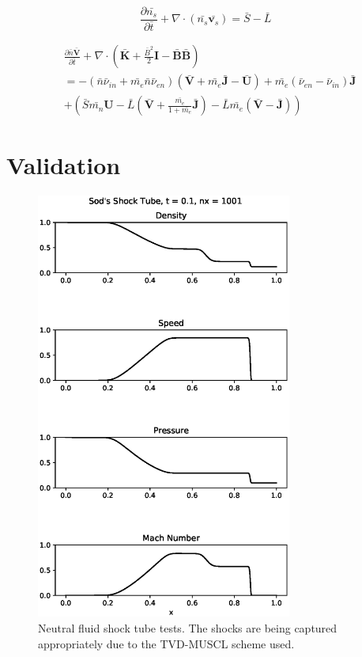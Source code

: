 \documentclass[12pt,upcase]{umlthesis}
\begin{document}
\begin{equation}\label{eq:normcontinuity}
	\frac{\partial \bar{n_s}}{\partial \bar{t}} + \nabla \cdot (\bar{n_s} \bar{\textbf{v}_s}) = \bar{S} - \bar{L}
\end{equation}

\begin{equation}\label{eq:normmomentumcom}
\begin{aligned}
	&\frac{\partial \bar{n} \bar{\textbf{V}}}{\partial \bar{t}} + \nabla \cdot (\bar{\textbf{K}} + \frac{\bar{B}^2}{2}\textbf{I} - \bar{\textbf{B}}\bar{\textbf{B}}) \\
	&= - (\bar{n} \bar{\nu}_{in} + \bar{m_e} \bar{n} \bar{\nu}_{en})(\bar{\textbf{V}} +\bar{m_e}\bar{\textbf{J}}  - \bar{\textbf{U}}) + \bar{m_e}(\bar{\nu}_{en}-\bar{\nu}_{in}) \bar{\textbf{J}}  \\
	&+ (\bar{S} \bar{m_n} \textbf{U} - \bar{L} (\bar{\textbf{V}}+ \frac{\bar{m_e}}{1+\bar{m_e}}\bar{\textbf{J}}) - \bar{L} \bar{m_e} (\bar{\textbf{V}} -\bar{\textbf{J}}) )
\end{aligned} 
\end{equation}

\section{Validation}

\begin{figure}[ht!]
	\includegraphics[width=0.75\textwidth]{images/shocktube.eps}
	\caption{Neutral fluid shock tube tests. The shocks are being captured appropriately due to the TVD-MUSCL scheme used.}\label{fig:shocktube}
\end{figure}
\end{document}
